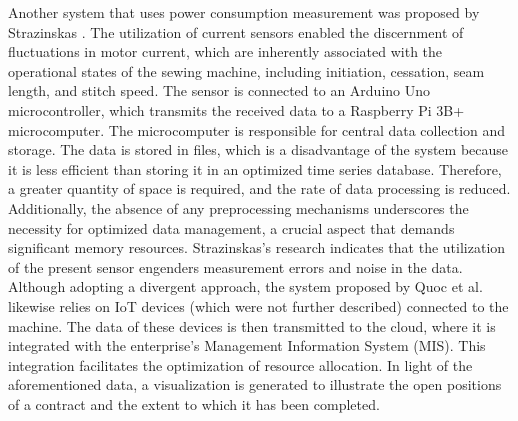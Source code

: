 Another system that uses power consumption measurement was proposed by Strazinskas \cite{strazinskasDevelopmentSolutionMonitoring2025}. The utilization of current sensors enabled the discernment of fluctuations in motor current, which are inherently associated with the operational states of the sewing machine, including initiation, cessation, seam length, and stitch speed. The sensor is connected to an Arduino Uno microcontroller, which transmits the received data to a Raspberry Pi 3B+ microcomputer. The microcomputer is responsible for central data collection and storage. The data is stored in files, which is a disadvantage of the system because it is less efficient than storing it in an optimized time series database. Therefore, a greater quantity of space is required, and the rate of data processing is reduced. Additionally, the absence of any preprocessing mechanisms underscores the necessity for optimized data management, a crucial aspect that demands significant memory resources. Strazinskas's research indicates that the utilization of the present sensor engenders measurement errors and noise in the data.\\
Although adopting a divergent approach, the system proposed by Quoc et al. \cite{quocApplyingIoTOperations2025} likewise relies on IoT devices (which were not further described) connected to the machine. The data of these devices is then transmitted to the cloud, where it is integrated with the enterprise's Management Information System (MIS). This integration facilitates the optimization of resource allocation. In light of the aforementioned data, a visualization is generated to illustrate the open positions of a contract and the extent to which it has been completed.\\
